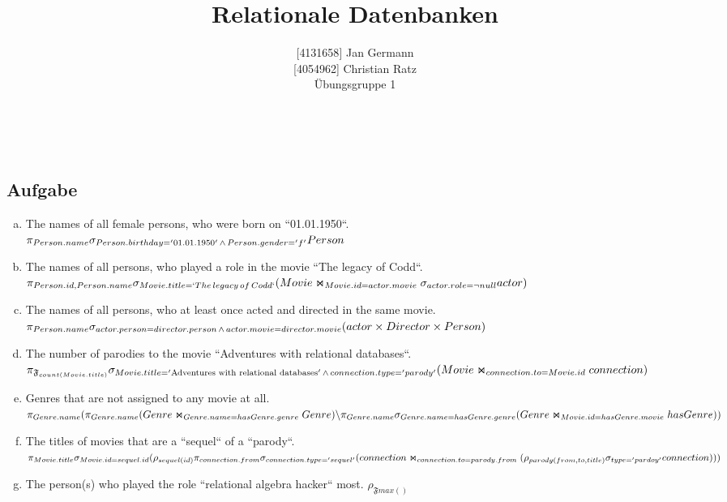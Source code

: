 \documentclass[11pt,a4paper,DIV=9]{scrartcl}
\author{{[}4131658{]} Jan Germann \\{[}4054962{]} Christian Ratz\\Übungsgruppe 1}
\title{Relationale Datenbanken}
\newcounter{temp}
\newcommand{\aufgabe}[1]{
  \setcounter{temp}{\value{subsection}}
  \setcounter{subsection}{#1}
  \addtocounter{subsection}{-1}
  \subsection{Aufgabe}
  \setcounter{subsection}{\value{temp}}
}
\renewcommand{\author}[1]{\renewcommand{\author}{#1}}
\renewcommand{\title}[1]{\renewcommand{\title}{#1}}
\newcommand{\makehomeworktitle}{
  \begin{minipage}[t]{6.5cm}
    \sf{\author}
  \end{minipage}
  \begin{minipage}[t]{6.5cm}
    \begin{flushright}
      \sf{\title\\\today}
    \end{flushright}
  \end{minipage}
  \\[0.2cm]
  \begin{center}
    \sf{
      \color{blue}{
        \LARGE{Aufgabenblatt \blattnr}
      }
    }
  \end{center}
  \vspace{0.1cm}
}
\begin{document}
\makehomeworktitle
\aufgabe{1}
  \begin{enumerate}[a)]
    \item The names of all female persons, who were born on ``01.01.1950``.\hfill\\
      $
      \pi_{Person.name}\\
      \sigma_{Person.birthday = '01.01.1950'\,\wedge\,Person.gender = 'f'}\\
      Person
      $
    \item The names of all persons, who played a role in the movie ``The legacy of Codd``. \hfill\\
      $
      \pi _{Person.id, Person.name}\\
      \sigma _{Movie.title=`{The\, legacy\, of\, Codd`}}\\
      (Movie\Join_{Movie.id = actor.movie} \sigma _{actor.role = \neg null} actor)
      $
    \item The names of all persons, who at least once acted and directed in the same movie.\hfill\\
      $
      \pi _{Person.name}\\
      \sigma _{actor.person = director.person \,\wedge\, actor.movie = director.movie}\\
      (actor \times Director \times Person)
      $
    \item The number of parodies to the movie ``Adventures with relational databases``.
      $
      \pi_{\mathfrak{F}_{count(Movie.title)}} \\
      \sigma_{Movie.title = '\textrm{Adventures with relational databases}' \,\wedge\, connection.type = 'parody'}\\
      (Movie\Join_{connection.to = Movie.id}connection)
      $

    \item Genres that are not assigned to any movie at all. \hfill \\
      $
      \pi _{Genre.name} \\
      (\pi _{Genre.name}(Genre \Join _{Genre.name = hasGenre.genre} Genre )\\
      \backslash
        \\
        \pi _{Genre.name} \sigma _{Genre.name = hasGenre.genre} (Genre \Join _{Movie.id = hasGenre.movie} hasGenre))
      $
    \item The titles of movies that are a ``sequel`` of a ``parody``. \\
      $\pi_{Movie.title} \\
      \sigma_{Movie.id = sequel.id} \\
      (\rho_{sequel(id)}\\
      \pi_{connection.from}\sigma_{connection.type='sequel'}\\
      (connection \Join_{connection.to = parody.from} \\ 
        (\rho_{parody(from,to,title)}\sigma_{type='pardoy'}connection)\\
      )\\
      )$
    \item The person(s) who played the role ``relational algebra hacker`` most.
      $
      \rho_{\mathfrak{F}max()}
      $
  \end{enumerate}
\end{document}
